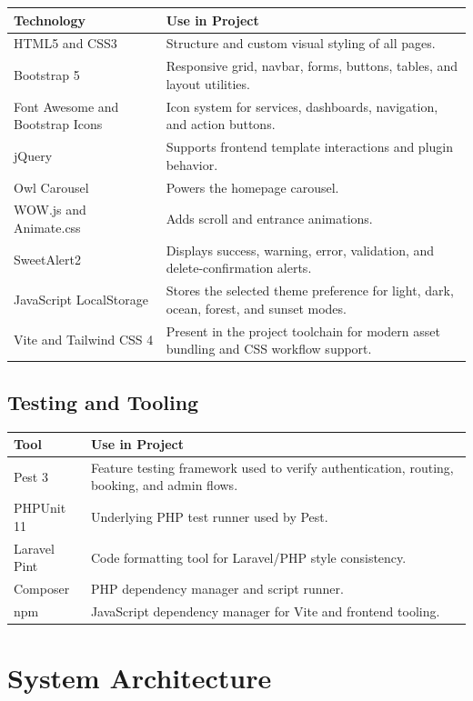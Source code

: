 \documentclass[12pt,a4paper]{report}
\begin{document}
\begin{longtable}{L{0.28\textwidth} L{0.62\textwidth}}
\toprule
\textbf{Technology} & \textbf{Use in Project} \\
\midrule
HTML5 and CSS3 & Structure and custom visual styling of all pages. \\
Bootstrap 5 & Responsive grid, navbar, forms, buttons, tables, and layout utilities. \\
Font Awesome and Bootstrap Icons & Icon system for services, dashboards, navigation, and action buttons. \\
jQuery & Supports frontend template interactions and plugin behavior. \\
Owl Carousel & Powers the homepage carousel. \\
WOW.js and Animate.css & Adds scroll and entrance animations. \\
SweetAlert2 & Displays success, warning, error, validation, and delete-confirmation alerts. \\
JavaScript LocalStorage & Stores the selected theme preference for light, dark, ocean, forest, and sunset modes. \\
Vite and Tailwind CSS 4 & Present in the project toolchain for modern asset bundling and CSS workflow support. \\
\bottomrule
\end{longtable}

\section{Testing and Tooling}

\begin{longtable}{L{0.28\textwidth} L{0.62\textwidth}}
\toprule
\textbf{Tool} & \textbf{Use in Project} \\
\midrule
Pest 3 & Feature testing framework used to verify authentication, routing, booking, and admin flows. \\
PHPUnit 11 & Underlying PHP test runner used by Pest. \\
Laravel Pint & Code formatting tool for Laravel/PHP style consistency. \\
Composer & PHP dependency manager and script runner. \\
npm & JavaScript dependency manager for Vite and frontend tooling. \\
\bottomrule
\end{longtable}

\chapter{System Architecture}
\end{document}
